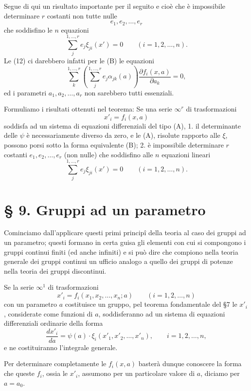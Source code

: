 \documentclass[11pt]{book}
\begin{document}
Segue di qui un risultato importante per il seguito e cioè che è impossibile determinare $r$ costanti non tutte nulle
\[
 e_1,e_2,\ldots,e_r
\]
che soddisfino le $n$ equazioni
\begin{equation*}\tag{12}
 \sum\limits_j^{1,\ldots,r}e_j\xi_{ji}(x')=0\qquad (i=1,2,\ldots,n).
\end{equation*}
Le (12) ci darebbero infatti per le (B) le equazioni
\[
 \sum\limits_k^{1,\ldots,r}\left(\sum\limits_j^{1,\ldots,r}e_j\alpha_{jk}(a)\right)
 \frac{\partial f_i(x,a)}{\partial a_k}=0,
\]
ed i parametri $a_1,a_2,\ldots,a_r$ non sarebbero tutti essenziali.

Formuliamo i risultati ottenuti nel teorema:
Se una serie $\infty^r$ di trasformazioni
\[
 x'_i=f_i(x,a)
\]
soddisfa ad un sistema di equazioni differenziali del tipo (A), 1. il determinante delle $\psi$ è necessariamente diverso da zero, e le (A), risolute rapporto alle $\xi$, possono porsi sotto la forma equivalente (B); 2. è impossibile determinare $r$ costanti $e_1,e_2,\ldots,e_r$ (non nulle) che soddisfino alle $n$ equazioni lineari
\[
 \sum\limits_j^{1,\ldots,r}e_j\xi_{ji}(x')=0\qquad (i=1,2,\ldots,n).
\]

\section*{\S{} 9. Gruppi ad un parametro}

Cominciamo dall'applicare questi primi principî della teoria al caso dei gruppi ad un parametro; questi formano in certa guisa gli elementi con cui si compongono i gruppi continui finiti (ed anche infiniti) e si può dire che compiono nella teoria generale dei gruppi continui un ufficio analogo a quello dei gruppi di potenze nella teoria dei gruppi discontinui.

Se la serie $\infty^1$ di trasformazioni
\begin{equation*}\tag{13}
 x'_i=f_i(x_1,x_2,\ldots,x_n;a)\qquad (i=1,2,\ldots,n)
\end{equation*}
con un parametro $a$ costituisce un gruppo, pel teorema fondamentale del \S{}7 le $x'_i$, considerate come funzioni di $a$, soddisferanno ad un sistema di equazioni differenziali ordinarie della forma
\begin{equation*}\tag{14}
 \frac{dx'_i}{da}=\psi(a)\cdot \xi_i(x'_1,x'_2,\ldots,x'_n),
 \qquad i=1,2,\ldots,n,
\end{equation*}
e ne costituiranno l'integrale generale.

Per determinare completamente le $f_i(x,a)$ basterà dunque conoscere la forma che queste $f_i$, ossia le $x'_i$, assumono per un particolare valore di $a$, diciamo per $a=a_0$.
\end{document}
